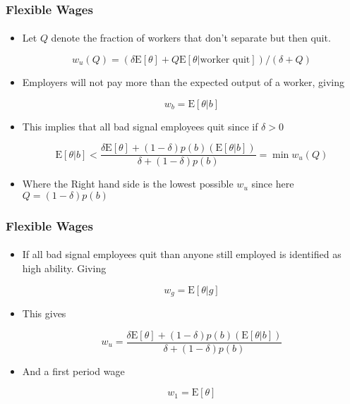\documentclass{beamer}
\newcommand{\E}{\mathrm{E}}
\begin{document}
\begin{frame}
\frametitle{Flexible Wages}
\framesubtitle{}

\begin{itemize}
	\setlength{\itemsep}{3mm}
	\item Let $Q$ denote the fraction of workers that don't separate but then quit.  
	
	$$ w_u(Q) = (\delta \E[\theta] + Q \E[\theta | \text{worker quit}])/(\delta + Q)$$
	
	\item Employers will not pay more than the expected output of a worker, giving
	
	$$ w_b = \E[\theta | b] $$
	
	\item This implies that all bad signal employees quit since if $\delta > 0$ 
	
	$$ \E[\theta|b] < \frac{ \delta \E[\theta] + (1-\delta)p(b)( \E[\theta | b])}{\delta + (1-\delta)p(b)} = \min w_u(Q) $$
	
	\item Where the Right hand side is the lowest possible $w_u$ since here $ Q = (1-\delta)p(b)$
\end{itemize}
\end{frame}


\begin{frame}
\frametitle{Flexible Wages}
\framesubtitle{}

\begin{itemize}
	\setlength{\itemsep}{3mm}
	\item If all bad signal employees quit than anyone still employed is identified as high ability. Giving
	
	$$ w_g = \E[\theta|g]$$
	
	\item This gives 
	
	$$ w_u =  \frac{ \delta \E[\theta] + (1-\delta)p(b)( \E[\theta | b])}{\delta + (1-\delta)p(b)}$$
	
	\item And a first period wage 
	
	$$w_1 = \E[\theta]$$

\end{itemize}
\end{frame}
\end{document}

